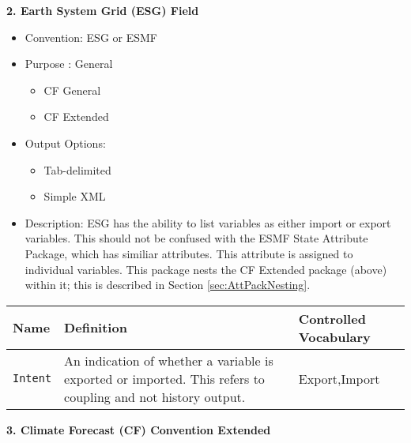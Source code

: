 \vspace{.20in}
{\bf 2. Earth System Grid (ESG) Field}

\begin{itemize}
    \item Convention: ESG or ESMF
    \item Purpose : General
\begin{itemize}
        \item CF General
        \item CF Extended
    \end{itemize}
    \item Output Options: 
    \begin{itemize}
        \item Tab-delimited
        \item Simple XML
    \end{itemize}
    \item Description: ESG has the ability to list variables as either import or export variables. This should not be confused with the ESMF State Attribute Package, which has similiar attributes. This attribute is assigned to individual variables.   This package nests the CF Extended package (above) within it; this is described in Section \ref{sec:AttPackNesting}.
\end{itemize}

\begin{tabular}{|p{6cm}|p{10cm}|p{10cm}|}
     {\bf Name } & {\bf Definition} & {\bf Controlled Vocabulary} \\
     \hline\hline
     {\tt Intent} & An indication of whether a variable is exported or imported. This refers to coupling and not history output. & Export,Import\\
\end{tabular}


\vspace{.20in}
{\bf 3. Climate Forecast (CF) Convention Extended}

